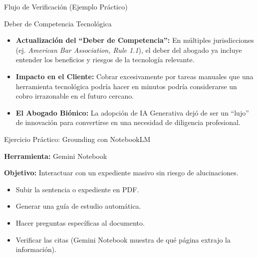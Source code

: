 \documentclass[aspectratio=169]{beamer}
\begin{document}
\begin{frame}{Flujo de Verificación (Ejemplo Práctico)}


\begin{center}
\end{center}

\end{frame}

\begin{frame}{Deber de Competencia Tecnológica}


\begin{itemize}
  \item \textbf{Actualización del ``Deber de Competencia'':} En múltiples jurisdicciones (ej. \textit{American Bar Association, Rule 1.1}), el deber del abogado ya incluye entender los beneficios y riesgos de la tecnología relevante.
  \item \textbf{Impacto en el Cliente:} Cobrar excesivamente por tareas manuales que una herramienta tecnológica podría hacer en minutos podría considerarse un cobro irrazonable en el futuro cercano.
  \item \textbf{El Abogado Biónico:} La adopción de IA Generativa dejó de ser un ``lujo'' de innovación para convertirse en una necesidad de diligencia profesional.
\end{itemize}
\end{frame}

\begin{frame}{Ejercicio Práctico: Grounding con NotebookLM}


\textbf{Herramienta:} Gemini Notebook \cite{notebooklm2024}

\textbf{Objetivo:} Interactuar con un expediente masivo sin riesgo de alucinaciones.

\begin{itemize}
  \item Subir la sentencia o expediente en PDF.
  \item Generar una guía de estudio automática.
  \item Hacer preguntas específicas al documento.
  \item Verificar las citas (Gemini Notebook muestra de qué página extrajo la información).
\end{itemize}
\end{frame}
\end{document}
